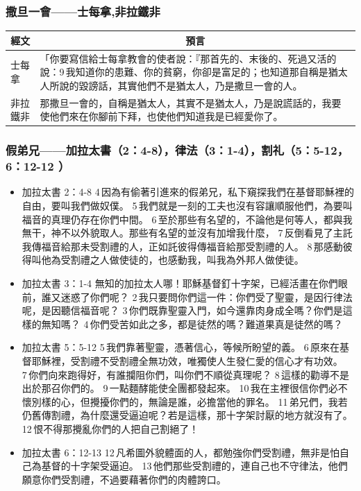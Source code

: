 \subsubsection{撒旦一會——士每拿,非拉鐵非}
\begin{table}[H]
\centering
\begin{tabular}{p{}|p{}}\hline\hline
\multicolumn{1}{c|}{經文}&\multicolumn{1}{c}{預言}\\\hline 
士每拿 &「你要寫信給士每拿教會的使者說：『那首先的、末後的、死過又活的說：9 我知道你的患難、你的貧窮，你卻是富足的；也知道那自稱是猶太人所說的毀謗話，其實他們不是猶太人，乃是撒旦一會的人。\\\hline
非拉鐵非&那撒旦一會的，自稱是猶太人，其實不是猶太人，乃是說謊話的，我要使他們來在你腳前下拜，也使他們知道我是已經愛你了。\\\hline
\end{tabular} 
\end{table}

 
 
 \subsubsection{假弟兄——加拉太書（2：4-8），律法（3：1-4），割礼（5：5-12，6：12-12 ） } 
 \begin{itemize}
 \itemsep-.25em
\item 加拉太書 2：4-8
  4 因為有偷著引進來的假弟兄，私下窺探我們在基督耶穌裡的自由，要叫我們做奴僕。 5 我們就是一刻的工夫也沒有容讓順服他們，為要叫福音的真理仍存在你們中間。 6 至於那些有名望的，不論他是何等人，都與我無干，神不以外貌取人。那些有名望的並沒有加增我什麼， 7 反倒看見了主託我傳福音給那未受割禮的人，正如託彼得傳福音給那受割禮的人。 8 那感動彼得叫他為受割禮之人做使徒的，也感動我，叫我為外邦人做使徒。
\item  加拉太書 3：1-4
 無知的加拉太人哪！耶穌基督釘十字架，已經活畫在你們眼前，誰又迷惑了你們呢？ 2 我只要問你們這一件：你們受了聖靈，是因行律法呢，是因聽信福音呢？ 3 你們既靠聖靈入門，如今還靠肉身成全嗎？你們是這樣的無知嗎？ 4 你們受苦如此之多，都是徒然的嗎？難道果真是徒然的嗎？
 \item 加拉太書 5：5-12
  5 我們靠著聖靈，憑著信心，等候所盼望的義。 6 原來在基督耶穌裡，受割禮不受割禮全無功效，唯獨使人生發仁愛的信心才有功效。 7 你們向來跑得好，有誰攔阻你們，叫你們不順從真理呢？ 8 這樣的勸導不是出於那召你們的。 9 一點麵酵能使全團都發起來。 10 我在主裡很信你們必不懷別樣的心，但攪擾你們的，無論是誰，必擔當他的罪名。 11 弟兄們，我若仍舊傳割禮，為什麼還受逼迫呢？若是這樣，那十字架討厭的地方就沒有了。 12 恨不得那攪亂你們的人把自己割絕了！
\item 加拉太書 6：12-13 
   12 凡希圖外貌體面的人，都勉強你們受割禮，無非是怕自己為基督的十字架受逼迫。 13 他們那些受割禮的，連自己也不守律法，他們願意你們受割禮，不過要藉著你們的肉體誇口。
  \end{itemize}
 
